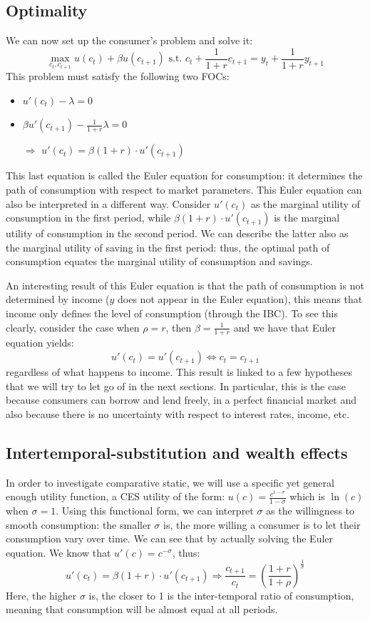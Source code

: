 \documentclass[12pt]{report}
\begin{document}
\subsection{Optimality}

We can now set up the consumer's problem and solve it: $$\max_{c_t, c_{t+1}} u(c_t) + \beta u(c_{t+1})\text{ s.t. } c_t + \frac{1}{1+r}c_{t+1} = y_t + \frac{1}{1+r}y_{t+1} $$ This problem must satisfy the following two FOCs:\begin{itemize}
\item $u'(c_t) - \lambda = 0$
\item $\beta u'(c_{t+1}) - \frac{1}{1+r}\lambda = 0$
\item[$\Rightarrow$] $u'(c_t) = \beta (1 + r) \cdot u'(c_{t+1})$
\end{itemize}

This last equation is called the Euler equation for consumption: it determines the path of consumption with respect to market parameters. This Euler equation can also be interpreted in a different way. Consider $u'(c_t)$ as the marginal utility of consumption in the first period, while $\beta (1 + r) \cdot u'(c_{t+1})$ is the marginal utility of consumption in the second period. We can describe the latter also as the marginal utility of saving in the first period: thus, the optimal path of consumption equates the marginal utility of consumption and savings.

An interesting result of this Euler equation is that the path of consumption is not determined by income ($y$ does not appear in the Euler equation), this means that income only defines the level of consumption (through the IBC). To see this clearly, consider the case when $\rho = r$, then $\beta = \frac{1}{1+r}$ and we have that Euler equation yields: $$u'(c_t) = u'(c_{t+1}) \Leftrightarrow c_t = c_{t+1} $$ regardless of what happens to income. This result is linked to a few hypotheses that we will try to let go of in the next sections. In particular, this is the case because consumers can borrow and lend freely, in a perfect financial market and also because there is no uncertainty with respect to interest rates, income, etc.

\subsection{Intertemporal-substitution and wealth effects}

In order to investigate comparative static, we will use a specific yet general enough utility function, a CES utility of the form: $u(c) = \frac{c^{1-\sigma}}{1-\sigma}$ which is $\ln(c)$ when $\sigma = 1$. Using this functional form, we can interpret $\sigma$ as the willingness to smooth consumption: the smaller $\sigma$ is, the more willing a consumer is to let their consumption vary over time. We can see that by actually solving the Euler equation. We know that $u'(c) = c^{-\sigma}$, thus: $$u'(c_t) = \beta (1 + r) \cdot u'(c_{t+1}) \Rightarrow \frac{c_{t+1}}{c_t} = \left(\frac{1+r}{1+\rho}\right)^{\frac{1}{\sigma}} $$ Here, the higher $\sigma$ is, the closer to 1 is the inter-temporal ratio of consumption, meaning that consumption will be almost equal at all periods.
\end{document}
